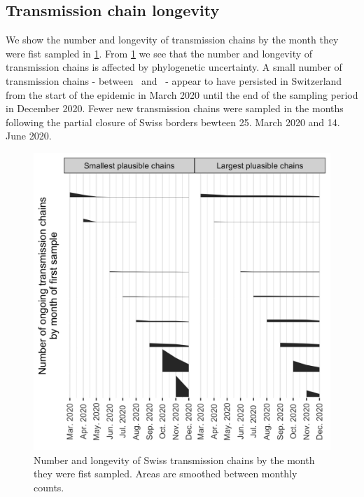 \documentclass[9pt,twocolumn,twoside,lineno]{pnas-new}
\begin{document}

\subsection{Transmission chain longevity}
We show the number and longevity of transmission chains by the month they were fist sampled in \ref{fig:chain-longevity}. From \ref{fig:chain-longevity} we see that the number and longevity of transmission chains is affected by phylogenetic uncertainty. A small number of transmission chains - between \nspanningchainsmax\ and \nspanningchainsmin\ - appear to have persisted in Switzerland from the start of the epidemic in March 2020 until the end of the sampling period in December 2020. Fewer new transmission chains were sampled in the months following the partial closure of Swiss borders bewteen 25. March 2020 and 14. June 2020. 
\begin{figure}[tbhp]
\centering
\includegraphics[width=.8\linewidth]{figures/fig_S1_chain_longevity.png}
\caption{Number and longevity of Swiss transmission chains by the month they were fist sampled. Areas are smoothed between monthly counts.}
\label{fig:chain-longevity}
\end{figure}
\end{document}
